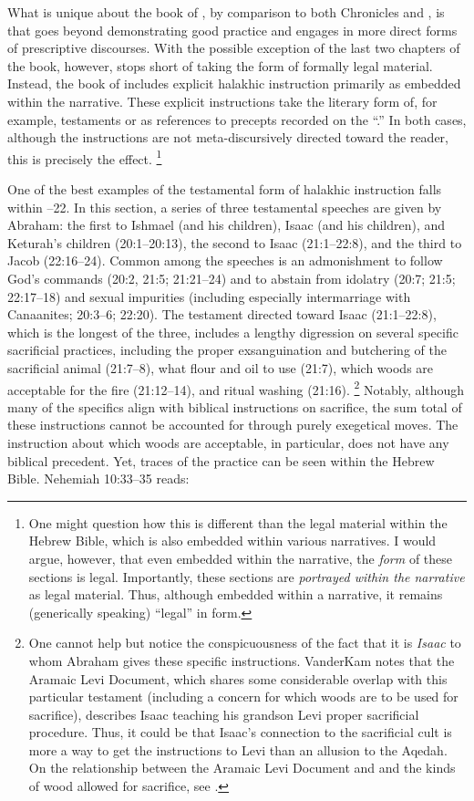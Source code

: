 What is unique about the book of \jub, by comparison to both Chronicles and \ga, is that \jub goes beyond demonstrating good practice and engages in more direct forms of prescriptive discourses. With the possible exception of the last two chapters of the book, however, \jub stops short of taking the form of formally legal material. Instead, the book of \jub includes explicit halakhic instruction primarily as embedded within the narrative. These explicit instructions take the literary form of, for example, testaments or as references to precepts recorded on the ``\heavenlytablets.'' In both cases, although the instructions are not meta-discursively directed toward the reader, this is precisely the effect.%
    \footnote{%
        One might question how this is different than the legal material within the Hebrew Bible, which is also embedded within various narratives. I would argue, however, that even embedded within the narrative, the \emph{form} of these sections is legal. Importantly, these sections are \emph{portrayed within the narrative} as legal material. Thus, although embedded within a narrative, it remains (generically speaking) ``legal'' in form.}

One of the best examples of the testamental form of halakhic instruction falls within --22. In this section, a series of three testamental speeches are given by Abraham: the first to Ishmael (and his children), Isaac (and his children), and Keturah's children (20:1--20:13), the second to Isaac (21:1--22:8), and the third to Jacob (22:16--24). Common among the speeches is an admonishment to follow God's commands (20:2, 21:5; 21:21--24) and to abstain from idolatry (20:7; 21:5; 22:17--18) and sexual impurities (including especially intermarriage with Canaanites; 20:3--6; 22:20). The testament directed toward Isaac (21:1--22:8), which is the longest of the three, includes a lengthy digression on several specific sacrificial practices, including the proper exsanguination and butchering of the sacrificial animal (21:7--8), what flour and oil to use (21:7), which woods are acceptable for the fire (21:12--14), and ritual washing (21:16).%
    \footnote{%
        One cannot help but notice the conspicuousness of the fact that it is \emph{Isaac} to whom Abraham gives these specific instructions. VanderKam notes that the Aramaic Levi Document, which shares some considerable overlap with this particular testament (including a concern for which woods are to be used for sacrifice), describes Isaac teaching his grandson Levi proper sacrificial procedure. Thus, it could be that Isaac's connection to the sacrificial cult is more a way to get the instructions to Levi than an allusion to the Aqedah. On the relationship between the Aramaic Levi Document and \jub and the kinds of wood allowed for sacrifice, see \cite[625, 636--639]{vanderkam2018}.}
Notably, although many of the specifics align with biblical instructions on sacrifice, the sum total of these instructions cannot be accounted for through purely exegetical moves. The instruction about which woods are acceptable, in particular, does not have any biblical precedent. Yet, traces of the practice can be seen within the Hebrew Bible.%
    \autocite{vanderkam2018}
Nehemiah 10:33--35 reads:

